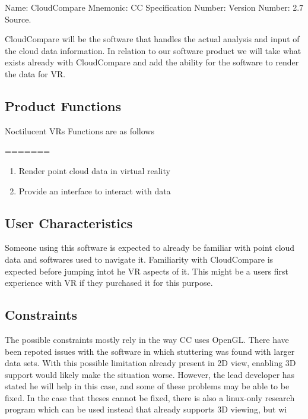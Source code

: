 \documentclass{article}
\begin{document}
Name: CloudCompare
Mnemonic: CC
Specification Number:
Version Number: 2.7
Source.

CloudCompare will be the software that handles the actual analysis and input of the cloud data information. 
In relation to our software product we will take what exists already with CloudCompare and add the ability for the software to render the data for VR.

\subsection{Product Functions}

Noctilucent VRs Functions are as follows

=======
\begin{enumerate}
\item Render point cloud data in virtual reality
\item Provide an interface to interact with data
\end{enumerate}

\subsection{User Characteristics}

Someone using this software is expected to already be familiar with point cloud data and softwares used to navigate it. 
Familiarity with CloudCompare is expected before jumping intot he VR aspects of it.
This might be a users first experience with VR if they purchased it for this purpose.

\subsection{Constraints}

The possible constraints mostly rely in the way CC uses OpenGL. There have been repoted issues with the software in which
stuttering was found with larger data sets. With this possible limitation already present in 2D view, enabling 3D support would
likely make the situation worse. However, the lead developer has stated he will help in this case, and some of these problems 
may be able to be fixed. In the case that theses cannot be fixed, there is also a linux-only research program which can be used
instead that already supports 3D viewing, but wi
\end{document}
